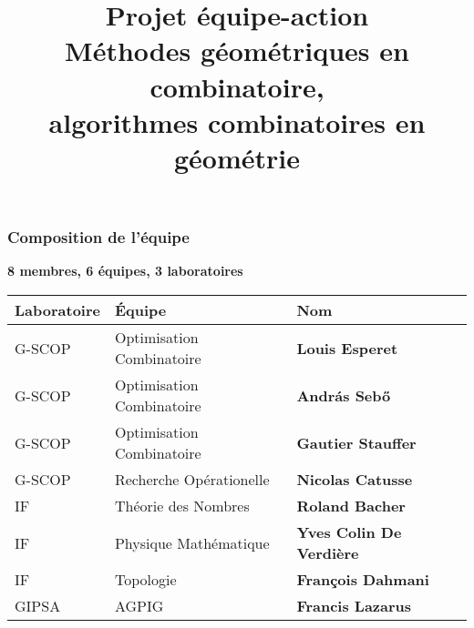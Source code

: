 \documentclass[a4paper,compress]{beamer}  %
\title[PERSYVAL-Lab]{Projet équipe-action\\
{\bf Méthodes géométriques en combinatoire,\\
algorithmes combinatoires en géométrie
}}
\date{}
\theoremstyle{definition}
\begin{document}

\begin{frame}
\titlepage{}
\end{frame}
\begin{frame}
\frametitle{Composition de l'équipe}
\begin{center}
\textbf{8 membres, 6 équipes, 3 laboratoires}
\vspace{1cm}

\begin{tabular}{|l  | l @{} |l|}
  \hline
 Laboratoire & Équipe & Nom \\
\hline \hline
\rowcolor{LightBlue2}
\cellcolor{LightBlue1}G-SCOP & {\small Optimisation Combinatoire} & {\bf Louis Esperet} \\
\hline
\rowcolor{LightBlue2}
\cellcolor{LightBlue1}G-SCOP & {\small Optimisation Combinatoire} & {\bf Andr\'as Seb\H{o}} \\
\hline
\rowcolor{LightBlue2}
\cellcolor{LightBlue1}G-SCOP & {\small Optimisation Combinatoire}& {\bf Gautier Stauffer} \\
\hline
\rowcolor{LightBlue3}
\cellcolor{LightBlue1}G-SCOP & {\small Recherche Opérationelle}& {\bf Nicolas Catusse} \\
\hline
\rowcolor{LightGreen2}
\cellcolor{LightGreen1}IF & {\small Théorie des Nombres} & {\bf Roland Bacher} \\
\hline
\rowcolor{LightGreen3}
\cellcolor{LightGreen1}IF & {\small Physique Mathématique}& {\bf Yves Colin De Verdière} \\
\hline
\rowcolor{LightGreen4}
\cellcolor{LightGreen1}IF & {\small Topologie} & {\bf François Dahmani} \\
\hline
\rowcolor{blue!25}
\cellcolor{blue!10}GIPSA & {\small AGPIG} & {\bf Francis Lazarus} \\
\hline
\end{tabular}
\end{center}

\end{frame}
\end{document}
